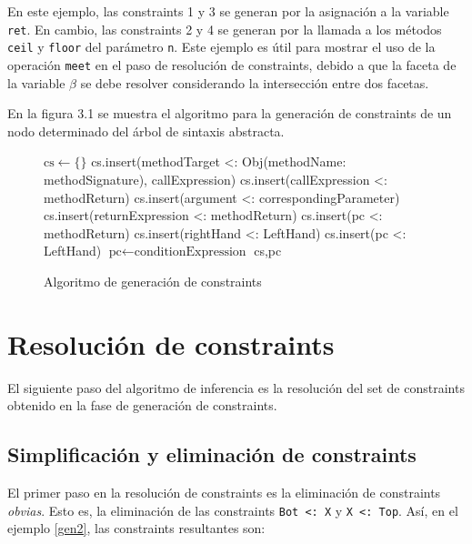 En este ejemplo, las constraints 1 y 3 se generan por la asignación a la variable \texttt{ret}. En cambio, las constraints 2 y 4 se generan por la llamada a los métodos \texttt{ceil} y \texttt{floor} del parámetro \texttt{n}. Este ejemplo es útil para mostrar el uso de la operación \texttt{meet} en el paso de resolución de constraints, debido a que la faceta de la variable $\beta$ se debe resolver considerando la intersección entre dos facetas.

En la figura 3.1 se muestra el algoritmo para la generación de constraints de un nodo determinado del árbol de sintaxis abstracta.

\begin{figure}[ht]
  \centering
  \label{pseudogen}
  \begin{mdframed}
    \begin{algorithmic}
          \State $\text{cs}\gets \{\}$
            \State cs.insert(methodTarget <: Obj(methodName: methodSignature), callExpression)
            \State cs.insert(callExpression <: methodReturn)
              \State cs.insert(argument <: correspondingParameter)
            \EndFor
            \State cs.insert(returnExpression <: methodReturn)
            \State cs.insert(pc <: methodReturn)
            \State cs.insert(rightHand <: LeftHand)
            \State cs.insert(pc <: LeftHand)
            \State $\text{pc}\gets \text{conditionExpression}$
          \EndIf
          \State \Return cs,pc
      \EndFunction
    \end{algorithmic}
  \end{mdframed}
  \caption{Algoritmo de generación de constraints}
\end{figure}

\section{Resolución de constraints} \label{propuestaRes}

El siguiente paso del algoritmo de inferencia es la resolución del set de constraints obtenido en la fase de generación de constraints.

\subsection{Simplificación y eliminación de constraints}
El primer paso en la resolución de constraints es la eliminación de constraints \textit{obvias}. Esto es, la eliminación de las constraints \texttt{Bot <: X} y \texttt{X <: Top}. Así, en el ejemplo \ref{gen2}, las constraints resultantes son:

